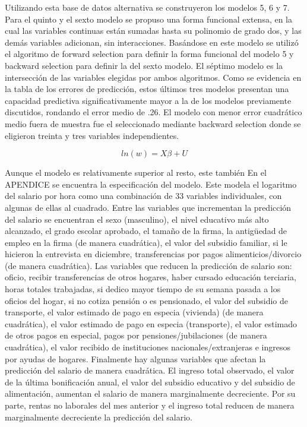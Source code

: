 \documentclass[12pt]{article}
\begin{document}
Utilizando esta base de datos alternativa se construyeron los modelos 5, 6 y 7. Para el quinto y el sexto modelo se propuso una forma funcional extensa, en la cual las variables continuas están sumadas hasta su polinomio de grado dos, y las demás variables adicionan, sin interacciones. Basándose en este modelo se utilizó el algoritmo de forward selection para definir la forma funcional del modelo 5 y backward selection para definir la del sexto modelo. El séptimo modelo es la intersección de las variables elegidas por ambos algoritmos.
Como se evidencia en la tabla de los errores de predicción, estos últimos tres modelos presentan una capacidad predictiva significativamente mayor a la de los modelos previamente discutidos, rondando el error medio de .26. El modelo con menor error cuadrático medio fuera de muestra fue el seleccionado mediante backward selection donde se eligieron treinta y tres variables independientes.


$$ln(w)= X\beta+U$$ 

Aunque el modelo es relativamente superior al resto, este también En el APENDICE se encuentra la especificación del modelo. Este modela el logaritmo del salario por hora como una combinación de 33 variables individuales, con algunas de ellas al cuadrado. Entre las variables que incrementan la predicción del salario se encuentran el sexo (masculino), el nivel educativo más alto alcanzado, el grado escolar aprobado, el tamaño de la firma, la antigüedad de empleo en la firma (de manera cuadrática), el valor del subsidio familiar, si le hicieron la entrevista en diciembre, transferencias por pagos alimenticios/divorcio (de manera cuadrática). Las variables que reducen la predicción de salario son: oficio, recibir transferencias de otros hogares, haber cursado educación terciaria, horas totales trabajadas, si dedico mayor tiempo de su semana pasada a los oficios del hogar, si no cotiza pensión o es pensionado, el valor del subsidio de transporte, el valor estimado de pago en especia (vivienda) (de manera cuadrática), el valor estimado de pago en especia (transporte), el valor estimado de otros pagos en especial, pagos por pensiones/jubilaciones (de manera cuadrática), el valor recibido de instituciones nacionales/extranjeras e ingresos por ayudas de hogares. Finalmente hay algunas variables que afectan la predicción del salario de manera cuadrática. El ingreso total observado, el valor de la última bonificación anual, el valor del subsidio educativo y del subsidio de alimentación, aumentan el salario de manera marginalmente decreciente. Por su parte, rentas no laborales del mes anterior y el ingreso total reducen de manera marginalmente decreciente la predicción del salario. \\
\end{document}
